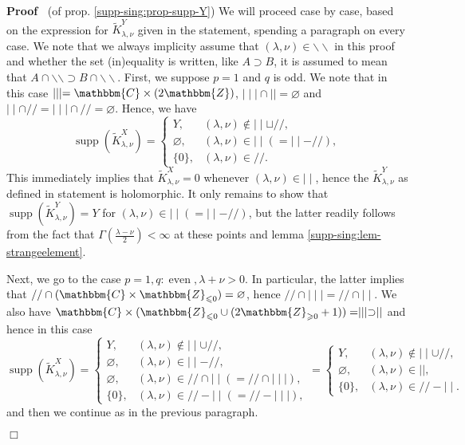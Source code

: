 \documentclass[12pt]{article}
\newcommand{\nin}{\not\in}
\newcommand{\tmop}[1]{\ensuremath{\operatorname{#1}}}
\renewenvironment{proof}{\noindent\textbf{Proof\ }}{\hspace*{\fill}$\Box$\medskip}
\theoremstyle{remark}
\begin{document}
\begin{proof}
  (of prop. \ref{supp-sing:prop-supp-Y}) We will proceed case by case, based
  on the expression for $\tilde{K}_{\lambda, \nu}^Y$ given in the statement,
  spending a paragraph on every case. We note that we always implicity assume
  that $(\lambda, \nu) \in \backslash\backslash$ in this proof and whether the
  set (in)equality is written, like $A \supset B$, it is assumed to mean that
  $A \cap \backslash\backslash \supset B \cap \backslash\backslash$. First, we
  suppose $p = 1$ and $q$ is odd. We note that in this case $\mid \mid \mid
  =\mathbbm{C} \times (2\mathbbm{Z})$, $\mid \mid \mid \cap \mid \mid =
  \varnothing$ and $\mid \mid \cap / / = \mid \mid \mid \cap / / =
  \varnothing$. Hence, we have
  \[ \tmop{supp} (\tilde{K}_{\lambda, \nu}^X) = \left\{ \begin{array}{ll}
       Y, & (\lambda, \nu) \nin \mid \mid \sqcup / /,\\
       \varnothing, & (\lambda, \nu) \in \mid \mid (= \mid \mid - / /),\\
       \{ 0 \}, & (\lambda, \nu) \in / / .
     \end{array} \right. \]
  This immediately implies that $\tilde{K}_{\lambda, \nu}^X = 0$ whenever
  $(\lambda, \nu) \in \mid \mid$, hence the $\tilde{K}_{\lambda, \nu}^Y$ as
  defined in statement is holomorphic. It only remains to show that
  $\tmop{supp} (\tilde{K}_{\lambda, \nu}^Y) = Y$ for $(\lambda, \nu) \in \mid
  \mid (= \mid \mid - / /)$, but the latter readily follows from the fact that
  $\Gamma \left( \frac{\lambda - \nu}{2} \right) < \infty$ at these points and
  lemma \ref{supp-sing:lem-strangeelement}.
  
  Next, we go to the case $p = 1, q : \tmop{even}, \lambda + \nu > 0$. In
  particular, the latter implies that $/ / \cap (\mathbbm{C} \times
  \mathbbm{Z}_{\leqslant 0}) = \varnothing$, hence $/ / \cap \mid \mid \mid =
  / / \cap \mid \mid$. We also have $\mathbbm{C} \times
  (\mathbbm{Z}_{\leqslant 0} \cup (2\mathbbm{Z}_{\geqslant 0} + 1)) = \mid
  \mid \mid \supset \mid \mid$ and hence in this case
  \[ \tmop{supp} (\tilde{K}_{\lambda, \nu}^X) = \left\{ \begin{array}{ll}
       Y, & (\lambda, \nu) \nin \mid \mid \cup / /,\\
       \varnothing, & (\lambda, \nu) \in \mid \mid - / /,\\
       \varnothing, & (\lambda, \nu) \in / / \cap \mid \mid (= / / \cap \mid
       \mid \mid),\\
       \{ 0 \}, & (\lambda, \nu) \in / / - \mid \mid (= / / - \mid \mid \mid),
     \end{array} \right. = \left\{ \begin{array}{ll}
       Y, & (\lambda, \nu) \nin \mid \mid \cup / /,\\
       \varnothing, & (\lambda, \nu) \in \mid \mid,\\
       \{ 0 \}, & (\lambda, \nu) \in / / - \mid \mid .
     \end{array} \right. \]
  and then we continue as in the previous paragraph.
  

\end{proof}
\end{document}
